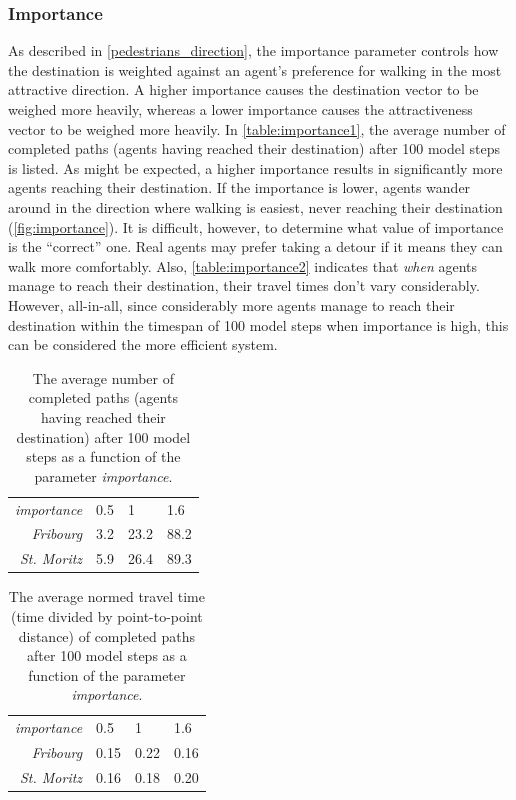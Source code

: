 \documentclass[a4paper, DIV11, abstracton]{scrartcl}
\begin{document}
\subsubsection{Importance}
As described in \autoref{pedestrians_direction}, the importance parameter controls how the destination is weighted against an agent's preference for walking in the most attractive direction. A higher importance causes the destination vector to be weighed more heavily, whereas a lower importance causes the attractiveness vector to be weighed more heavily. In \autoref{table:importance1}, the average number of completed paths (agents having reached their destination) after 100 model steps is listed. As might be expected, a higher importance results in significantly more agents reaching their destination. If the importance is lower, agents wander around in the direction where walking is easiest, never reaching their destination (\autoref{fig:importance}). It is difficult, however, to determine what value of importance is the ``correct'' one. Real agents may prefer taking a detour if it means they can walk more comfortably. Also, \autoref{table:importance2} indicates that \emph{when} agents manage to reach their destination, their travel times don't vary considerably. However, all-in-all, since considerably more agents manage to reach their destination within the timespan of 100 model steps when importance is high, this can be considered the more efficient system.

\begin{table}[htbp]
\begin{center}
 \setlength{\abovecaptionskip}{0pt}
 \setlength{\belowcaptionskip}{10pt}
\caption{The average number of completed paths (agents having reached their destination) after 100 model steps as a function of the parameter \emph{importance}.}
\begin{tabular}{r l l l}
  \hline
  \emph{importance} & 0.5 & 1 & 1.6 \\
  \emph{Fribourg} & 3.2 & 23.2 & 88.2  \\ 
  \emph{St. Moritz} & 5.9 & 26.4 & 89.3  \\
\hline
\end{tabular}
\label{table:importance1}
\end{center}
\end{table}

\begin{table}[htbp]
\begin{center}
 \setlength{\abovecaptionskip}{0pt}
 \setlength{\belowcaptionskip}{10pt}
\caption{The average normed travel time (time divided by point-to-point distance) of completed paths after 100 model steps as a function of the parameter \emph{importance}.}
\begin{tabular}{r l l l}
  \hline
  \emph{importance} & 0.5 & 1 & 1.6 \\
  \emph{Fribourg} & 0.15 & 0.22 & 0.16  \\ 
  \emph{St. Moritz} & 0.16 & 0.18 & 0.20  \\
\hline
\end{tabular}
\label{table:importance2}
\end{center}
\end{table}
\end{document}
